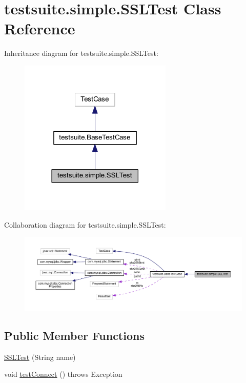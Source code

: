 \hypertarget{classtestsuite_1_1simple_1_1_s_s_l_test}{}\section{testsuite.\+simple.\+S\+S\+L\+Test Class Reference}
\label{classtestsuite_1_1simple_1_1_s_s_l_test}


Inheritance diagram for testsuite.\+simple.\+S\+S\+L\+Test\+:
\nopagebreak
\begin{figure}[H]
\begin{center}
\leavevmode
\includegraphics[width=206pt]{classtestsuite_1_1simple_1_1_s_s_l_test__inherit__graph}
\end{center}
\end{figure}


Collaboration diagram for testsuite.\+simple.\+S\+S\+L\+Test\+:
\nopagebreak
\begin{figure}[H]
\begin{center}
\leavevmode
\includegraphics[width=350pt]{classtestsuite_1_1simple_1_1_s_s_l_test__coll__graph}
\end{center}
\end{figure}
\subsection*{Public Member Functions}
\begin{DoxyCompactItemize}
\item 
\mbox{\hyperlink{classtestsuite_1_1simple_1_1_s_s_l_test_abdad6d8bc69a88f4a2f2f028f90cf287}{S\+S\+L\+Test}} (String name)
\item 
void \mbox{\hyperlink{classtestsuite_1_1simple_1_1_s_s_l_test_ad9e62b989cd5424f9ca3995f9bea794a}{test\+Connect}} ()  throws Exception 
\end{DoxyCompactItemize}
